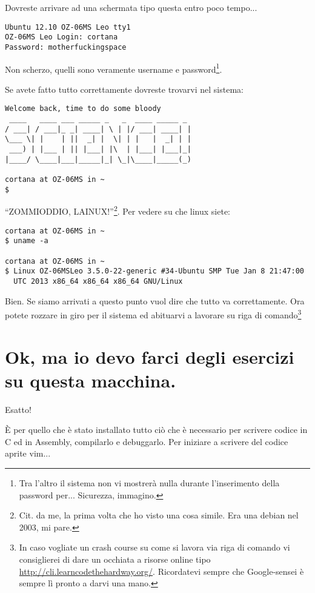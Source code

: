 \documentclass[a4paper]{memoir}
\begin{document}
		Dovreste arrivare ad una schermata tipo questa entro poco tempo...
		
		\begin{Verbatim}[label=Login + Password]
Ubuntu 12.10 OZ-06MS Leo tty1
OZ-06MS Leo Login: cortana
Password: motherfuckingspace
		\end{Verbatim}

		Non scherzo, quelli sono veramente username e password\footnote{Tra l'altro il sistema non vi mostrerà
		nulla durante l'inserimento della password per... Sicurezza, immagino.}.
		
		Se avete fatto tutto correttamente dovreste trovarvi nel sistema:

		\begin{Verbatim}[label=Party like it's 1999!]
Welcome back, time to do some bloody
 ____   ____ ___ _____ _   _  ____ _____ _ 
/ ___| / ___|_ _| ____| \ | |/ ___| ____| |
\___ \| |    | ||  _| |  \| | |   |  _| | |
 ___) | |___ | || |___| |\  | |___| |___|_|
|____/ \____|___|_____|_| \_|\____|_____(_)

cortana at OZ-06MS in ~
$ 
		\end{Verbatim}
		
		``ZOMMIODDIO, LAINUX!''\footnote{Cit. da me, la prima volta che ho visto una cosa simile. Era una debian
		nel 2003, mi pare.}. Per vedere su che linux siete:
		
		\begin{Verbatim}
cortana at OZ-06MS in ~
$ uname -a

cortana at OZ-06MS in ~
$ Linux OZ-06MSLeo 3.5.0-22-generic #34-Ubuntu SMP Tue Jan 8 21:47:00
  UTC 2013 x86_64 x86_64 x86_64 GNU/Linux
		\end{Verbatim}

		Bien. Se siamo arrivati a questo punto vuol dire che tutto va correttamente. Ora potete
		rozzare in giro per il sistema ed abituarvi a lavorare su riga di comando\footnote{In caso vogliate un
		crash course su come si lavora via riga di comando vi consiglierei di dare un occhiata a risorse online
		tipo \url{http://cli.learncodethehardway.org/}. Ricordatevi sempre che Google-sensei è sempre lì pronto
		a darvi una mano.}
		
	\section*{Ok, ma io devo farci degli esercizi su questa macchina.}
		
		Esatto!
		
		È per quello che è stato installato tutto ciò che è necessario per scrivere codice in C ed in Assembly,
        compilarlo e debuggarlo. Per iniziare a scrivere del codice aprite vim...
        
\end{document}
